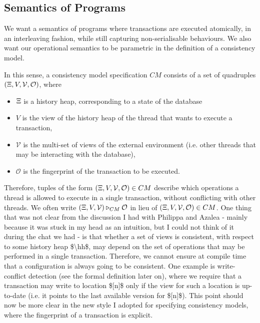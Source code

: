 \documentclass[a4paper,UKenglish]{article}%
\theoremstyle{plain}
\begin{document}
\subsection{Semantics of Programs}
We want a semantics of programs where transactions are 
executed atomically, in an interleaving fashion, while still capturing non-serialisable 
behaviours. We also want our operational semantics to be parametric in the definition of 
a consistency model. 

In this sense, a consistency model specification $CM$ consists of a set of quadruples 
$(\Xi, V, \mathcal{V}, \mathcal{O})$, where 
\begin{itemize}
\item $\hh$ is a history heap, corresponding to a state of the database
\item $V$ is the view of the history heap of the thread that wants to execute a 
transaction, 
\item $\mathcal{V}$ is the multi-set of views of the external environment (i.e. other 
threads that may be interacting with the database), 
\item $\mathcal{O}$ is the fingerprint of the transaction to be executed.
\end{itemize}
Therefore, tuples of the form $(\Xi, V, \mathcal{V}, \mathcal{O}) \in CM$ describe 
which operations a thread is allowed to execute in a single transaction, without conflicting 
with other threads. We often write $(\Xi, V, \mathcal{V}) \triangleright_{CM} \mathcal{O}$ 
in lieu of $(\Xi, V, \mathcal{V}, \mathcal{O}) \in CM$. 
\ac{One thing that was not clear from the discussion I had with Philippa and Azalea - 
mainly because it was stuck in my head as an intuition, but I could not think of it during 
the chat we had - is that whether a set of views is consistent, with respect to some history 
heap $\hh$, may depend on the set of operations that may 
be performed in a single transaction. Therefore, we cannot ensure at compile time 
that a configuration is always going to be consistent. One example is write-conflict detection (see the formal definition 
later on), where we require that a transaction may write to location $[n]$ only if the view for such a 
location is up-to-date (i.e. it points to the last available version for $[n]$). This point should now be 
more clear in the new style I adopted for specifying consistency models, where the fingerprint of a 
transaction is explicit.}
\end{document}
